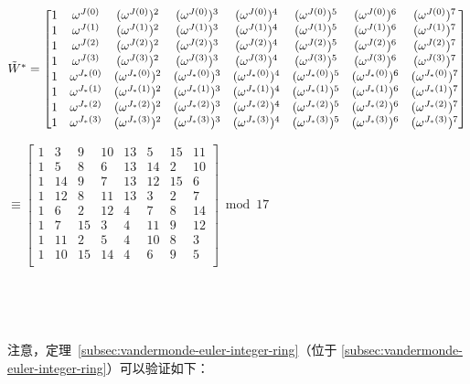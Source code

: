 $ $ 

$\tilde{W}^* = \begin{bmatrix}
1 & \omega^{J(0)} & (\omega^{J(0)})^2 & (\omega^{J(0)})^3 & (\omega^{J(0)})^4 & (\omega^{J(0)})^5 & (\omega^{J(0)})^6 & (\omega^{J(0)})^7\\
1 & \omega^{J(1)} & (\omega^{J(1)})^2 & (\omega^{J(1)})^3 & (\omega^{J(1)})^4& (\omega^{J(1)})^5& (\omega^{J(1)})^6& (\omega^{J(1)})^7\\
1 & \omega^{J(2)} & (\omega^{J(2)})^2 & (\omega^{J(2)})^3 & (\omega^{J(2)})^4 & (\omega^{J(2)})^5 & (\omega^{J(2)})^6 & (\omega^{J(2)})^7\\
1 & \omega^{J(3)} & (\omega^{J(3)})^2 & (\omega^{J(3)})^3 & (\omega^{J(3)})^4& (\omega^{J(3)})^5& (\omega^{J(3)})^6& (\omega^{J(3)})^7\\
1 & \omega^{J_*(0)} & (\omega^{J_*(0)})^2 & (\omega^{J_*(0)})^3 & (\omega^{J_*(0)})^4 & (\omega^{J_*(0)})^5 & (\omega^{J_*(0)})^6 & (\omega^{J_*(0)})^7\\
1 & \omega^{J_*(1)} & (\omega^{J_*(1)})^2 & (\omega^{J_*(1)})^3 & (\omega^{J_*(1)})^4& (\omega^{J_*(1)})^5& (\omega^{J_*(1)})^6& (\omega^{J_*(1)})^7\\
1 & \omega^{J_*(2)} & (\omega^{J_*(2)})^2 & (\omega^{J_*(2)})^3 & (\omega^{J_*(2)})^4 & (\omega^{J_*(2)})^5 & (\omega^{J_*(2)})^6 & (\omega^{J_*(2)})^7\\
1 & \omega^{J_*(3)} & (\omega^{J_*(3)})^2 & (\omega^{J_*(3)})^3 & (\omega^{J_*(3)})^4& (\omega^{J_*(3)})^5& (\omega^{J_*(3)})^6& (\omega^{J_*(3)})^7\\
\end{bmatrix}$

$ \equiv \begin{bmatrix}
1&3&9&10&13&5&15&11\\
1&5&8&6&13&14&2&10\\
1&14&9&7&13&12&15&6\\
1&12&8&11&13&3&2&7\\
1&6&2&12&4&7&8&14\\
1&7&15&3&4&11&9&12\\
1&11&2&5&4&10&8&3\\
1&10&15&14&4&6&9&5\\
\end{bmatrix}  \bmod{17}$

$ $

$ $

注意，定理~\ref*{subsec:vandermonde-euler-integer-ring}（位于 \autoref{subsec:vandermonde-euler-integer-ring}）可以验证如下：

